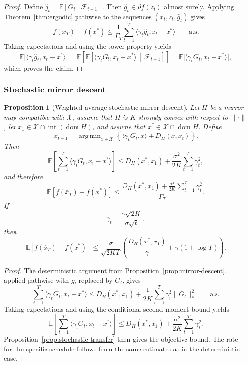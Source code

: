 \documentclass[11pt]{article}
\newtheorem{proposition}[theorem]{Proposition}
\theoremstyle{definition}
\theoremstyle{remark}
\newcommand{\X}{\mathcal{X}}
\newcommand{\E}{\mathbb{E}}
\newcommand{\inner}[2]{\langle #1, #2 \rangle}
\newcommand{\norm}[1]{\lVert #1 \rVert}
\newcommand{\normdual}[1]{\lVert #1 \rVert_*}
\DeclareMathOperator*{\argmin}{arg\,min}
\DeclareMathOperator{\dom}{dom}
\begin{document}
\begin{proof}
Define $\widehat g_t = \E[G_t \mid \mathcal{F}_{t-1}]$. Then $\widehat g_t \in \partial f(z_t)$ almost surely. Applying Theorem~\ref{thm:ergodic} pathwise to the sequences $(x_t,z_t,\widehat g_t)$ gives
\[
    f(\bar{x}_T)-f(x^*)
    \le
    \frac{1}{\Gamma_T}\sum_{t=1}^T \inner{\gamma_t \widehat g_t}{x_t-x^*}
    \qquad \text{a.s.}
\]
Taking expectations and using the tower property yields
\[
    \E\bigl[\inner{\gamma_t \widehat g_t}{x_t-x^*}\bigr]
    =
    \E\!\left[
        \E\!\left[\inner{\gamma_t G_t}{x_t-x^*} \,\middle|\, \mathcal{F}_{t-1}\right]
    \right]
    =
    \E\bigl[\inner{\gamma_t G_t}{x_t-x^*}\bigr],
\]
which proves the claim.
\end{proof}

\subsubsection{Stochastic mirror descent}

\begin{proposition}[Weighted-average stochastic mirror descent]
\label{prop:stochastic-md}
Let $H$ be a mirror map compatible with $\X$, assume that $H$ is $K$-strongly convex with respect to $\norm{\cdot}$, let $x_1 \in \X \cap \operatorname{int}(\dom H)$, and assume that $x^* \in \X \cap \dom H$. Define
\[
    x_{t+1}
    =
    \argmin_{x \in \X}
    \left\{
        \inner{\gamma_t G_t}{x}
        +
        D_H(x,x_t)
    \right\}.
\]
Then
\[
    \E\left[
        \sum_{t=1}^T \inner{\gamma_t G_t}{x_t-x^*}
    \right]
    \le
    D_H(x^*,x_1)
    +
    \frac{\sigma^2}{2K}\sum_{t=1}^T \gamma_t^2,
\]
and therefore
\[
    \E[f(\bar{x}_T)-f(x^*)]
    \le
    \frac{D_H(x^*,x_1) + \frac{\sigma^2}{2K}\sum_{t=1}^T \gamma_t^2}{\Gamma_T}.
\]
If
\[
    \gamma_t = \frac{\gamma \sqrt{2K}}{\sigma\sqrt{t}},
\]
then
\[
    \E[f(\bar{x}_T)-f(x^*)]
    \le
    \frac{\sigma}{\sqrt{2KT}}
    \left(
        \frac{D_H(x^*,x_1)}{\gamma}
        +
        \gamma(1+\log T)
    \right).
\]
\end{proposition}

\begin{proof}
The deterministic argument from Proposition~\ref{prop:mirror-descent}, applied pathwise with $g_t$ replaced by $G_t$, gives
\[
    \sum_{t=1}^T \inner{\gamma_t G_t}{x_t-x^*}
    \le
    D_H(x^*,x_1)
    +
    \frac{1}{2K}\sum_{t=1}^T \gamma_t^2 \normdual{G_t}^2
    \qquad \text{a.s.}
\]
Taking expectations and using the conditional second-moment bound yields
\[
    \E\left[
        \sum_{t=1}^T \inner{\gamma_t G_t}{x_t-x^*}
    \right]
    \le
    D_H(x^*,x_1)
    +
    \frac{\sigma^2}{2K}\sum_{t=1}^T \gamma_t^2.
\]
Proposition~\ref{prop:stochastic-transfer} then gives the objective bound. The rate for the specific schedule follows from the same estimates as in the deterministic case.
\end{proof}
\end{document}

